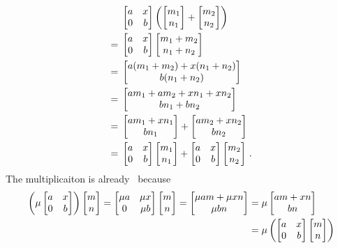 \begin{align*}
  {}&
  \begin{bmatrix}
    a & x \\
    0 & b
  \end{bmatrix}
  \left(
      \begin{bmatrix}  m_1 \\ n_1  \end{bmatrix}
    + \begin{bmatrix}  m_2 \\ n_2  \end{bmatrix}
  \right)
  \\
  ={}&
  \begin{bmatrix}
    a & x \\
    0 & b
  \end{bmatrix}
  \begin{bmatrix}  m_1 + m_2 \\ n_1 + n_2  \end{bmatrix}
  \\
  ={}&
  \begin{bmatrix}  a (m_1 + m_2) + x (n_1 + n_2) \\ b (n_1 + n_2)  \end{bmatrix}
  \\
  ={}&
  \begin{bmatrix}  a m_1 + a m_2 + x n_1 + x n_2 \\ b n_1 + b n_2  \end{bmatrix}
  \\
  ={}&
    \begin{bmatrix}  a m_1 + x n_1 \\ b n_1  \end{bmatrix}
  + \begin{bmatrix}  a m_2 + x n_2 \\ b n_2  \end{bmatrix}
  \\
  ={}&
  \begin{bmatrix}
    a & x \\
    0 & b
  \end{bmatrix}
  \begin{bmatrix}  m_1 \\ n_1  \end{bmatrix}
  +
  \begin{bmatrix}
    a & x \\
    0 & b
  \end{bmatrix}
  \begin{bmatrix}  m_2 \\ n_2  \end{bmatrix} \,.
\end{align*}
The multiplicaiton is already~{\kbil} because
\begin{align*}
  \left(
    \mu
    \begin{bmatrix}
      a & x \\
      0 & b
    \end{bmatrix}
  \right)
  \begin{bmatrix}  m \\ n  \end{bmatrix}
  =
  \begin{bmatrix}
    \mu a & \mu x \\
    0     & \mu b
  \end{bmatrix}
  \begin{bmatrix}  m \\ n  \end{bmatrix}
  =
  \begin{bmatrix} \mu a m + \mu x n \\ \mu b n \end{bmatrix}
  &=
  \mu \begin{bmatrix} a m + x n \\ b n \end{bmatrix}
  \\
  &=
  \mu
  \left(
    \begin{bmatrix}
      a & x \\
      0 & b
    \end{bmatrix}
    \begin{bmatrix}  m \\ n  \end{bmatrix}
  \right)
\end{align*}
